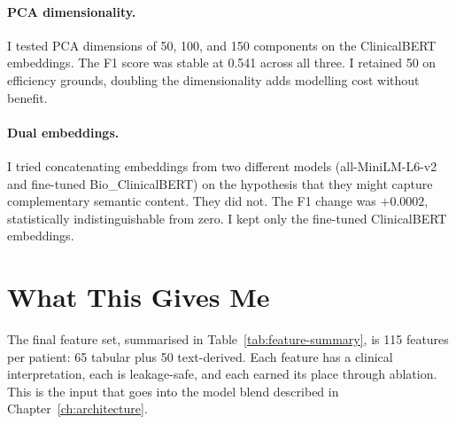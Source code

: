 \paragraph{PCA dimensionality.} I tested PCA dimensions of 50, 100, and 150 components on the ClinicalBERT embeddings. The F1 score was stable at 0.541 across all three. I retained 50 on efficiency grounds, doubling the dimensionality adds modelling cost without benefit.

\paragraph{Dual embeddings.} I tried concatenating embeddings from two different models (all-MiniLM-L6-v2 and fine-tuned Bio\_ClinicalBERT) on the hypothesis that they might capture complementary semantic content. They did not. The F1 change was $+0.0002$, statistically indistinguishable from zero. I kept only the fine-tuned ClinicalBERT embeddings.

\section{What This Gives Me}

The final feature set, summarised in Table~\ref{tab:feature-summary}, is 115 features per patient: 65 tabular plus 50 text-derived. Each feature has a clinical interpretation, each is leakage-safe, and each earned its place through ablation. This is the input that goes into the model blend described in Chapter~\ref{ch:architecture}.


